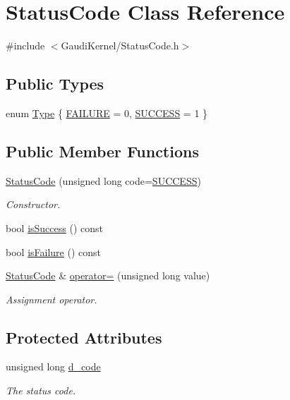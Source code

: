 \hypertarget{classStatusCode}{}\section{Status\+Code Class Reference}
\label{classStatusCode}


{\ttfamily \#include $<$Gaudi\+Kernel/\+Status\+Code.\+h$>$}

\subsection*{Public Types}
\begin{DoxyCompactItemize}
\item 
enum \hyperlink{classStatusCode_a6f565cbeadc76d14c72f047e5e85eb4b}{Type} \{ \hyperlink{classStatusCode_a6f565cbeadc76d14c72f047e5e85eb4ba3da73d4c469762eb9d3c960368252b26}{F\+A\+I\+L\+U\+RE} = 0, 
\hyperlink{classStatusCode_a6f565cbeadc76d14c72f047e5e85eb4badd0da38d3ba0d922efd1f4619bc37ad8}{S\+U\+C\+C\+E\+SS} = 1
 \}
\end{DoxyCompactItemize}
\subsection*{Public Member Functions}
\begin{DoxyCompactItemize}
\item 
\hyperlink{classStatusCode_aaf803a555dd2d841418328a747059b3e}{Status\+Code} (unsigned long code=\hyperlink{classStatusCode_a6f565cbeadc76d14c72f047e5e85eb4badd0da38d3ba0d922efd1f4619bc37ad8}{S\+U\+C\+C\+E\+SS})
\begin{DoxyCompactList}\small\item\em Constructor. \end{DoxyCompactList}\item 
bool \hyperlink{classStatusCode_acfe5ce8b2bb7d3d651fb0108c18c05c3}{is\+Success} () const
\item 
bool \hyperlink{classStatusCode_a5dd22dc6eb2c52fc4cabc58f6dea2eb7}{is\+Failure} () const
\item 
\hyperlink{classStatusCode}{Status\+Code} \& \hyperlink{classStatusCode_af5179c5605558840cefe14e2794265de}{operator=} (unsigned long value)
\begin{DoxyCompactList}\small\item\em Assignment operator. \end{DoxyCompactList}\end{DoxyCompactItemize}
\subsection*{Protected Attributes}
\begin{DoxyCompactItemize}
\item 
unsigned long \hyperlink{classStatusCode_aff37ebcb323b897044b42d303cf72d93}{d\+\_\+code}
\begin{DoxyCompactList}\small\item\em The status code. \end{DoxyCompactList}\end{DoxyCompactItemize}


